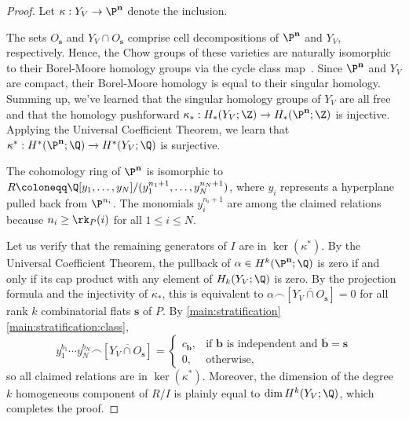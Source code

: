 \begin{proof}
  Let $\kappa: Y_V \to \P^{\mathbf n}$ denote the inclusion.

  The sets $O_{\mathbf s}$ and $Y_V \cap O_{\mathbf s}$ comprise  cell decompositions of $\P^{\mathbf n}$ and $Y_V$, respectively.
  Hence, the Chow groups of these varieties are naturally isomorphic to their Borel-Moore homology groups via the cycle class map~\cite[Example 19.1.11]{F98}.
  Since $\P^{\mathbf n}$ and $Y_V$ are compact, their Borel-Moore homology is equal to their singular homology.
  Summing up, we've learned that the singular homology groups of $Y_V$ are all free and that the homology pushforward $\kappa_*: H_*(Y_V; \Z) \to H_*(\P^{\mathbf n}; \Z)$ is injective.
  Applying the Universal Coefficient Theorem, we learn that $\kappa^*: H^*(\P^{\mathbf n}; \Q) \to H^*(Y_V; \Q)$ is surjective.
  
  The cohomology ring of $\P^{\mathbf n}$ is isomorphic to $R \coloneqq \Q[y_1, \ldots, y_N] / (y_1^{n_1+1}, \ldots, y_N^{n_N+1})$, where $y_i$ represents a hyperplane pulled back from $\P^{n_i}$. The monomials $y_i^{n_i+1}$ are among the claimed relations because $n_i \geq \rk_P(i)$ for all $1 \leq i \leq N$.

  Let us verify that the remaining generators of $I$ are in $\ker(\kappa^*)$. By the Universal Coefficient Theorem, the pullback of $\alpha \in H^k(\P^{\mathbf n}; \Q)$ is zero if and only if its cap product with any element of $H_k(Y_V; \Q)$ is zero.
  By the projection formula and the injectivity of $\kappa_*$, this is equivalent to $\alpha \smallfrown [\overline{Y_V \cap O_{\mathbf s}}] = 0$ for all rank $k$ combinatorial flats $\mathbf s$ of $P$.
  By \cref{main:stratification}\cref{main:stratification:class},
  \[ y_1^{b_1} \cdots y_N^{b_N} \smallfrown [\overline{Y_V \cap O_{\mathbf s}}] =
    \begin{cases}
        c_{\mathbf b}, & \text{if $\mathbf b$ is independent and $\overline{\mathbf b} =\mathbf s$} \\
      0, &\text{otherwise,}
    \end{cases} \]
  so all claimed relations are in $\ker(\kappa^*)$.
  Moreover, the dimension of the degree $k$ homogeneous component of $R/I$ is plainly equal to $\dim H^k(Y_V; \Q)$, which completes the proof.
\end{proof}

